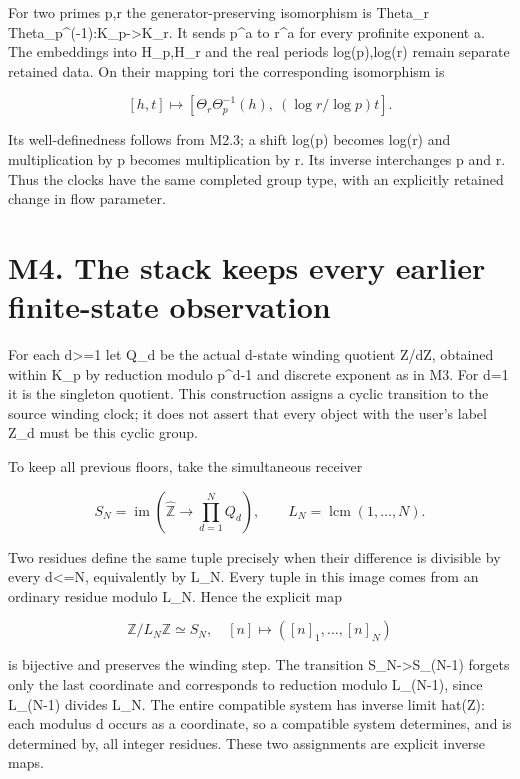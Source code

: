 For two primes p,r the generator-preserving isomorphism is Theta\_r
Theta\_p\^{}(-1):K\_p-\textgreater K\_r. It sends p\^{}a to r\^{}a for
every profinite exponent a. The embeddings into H\_p,H\_r and the real
periods log(p),log(r) remain separate retained data. On their mapping
tori the corresponding isomorphism is

\[
[h,t]\longmapsto
[\Theta_r\Theta_p^{-1}(h),\ (\log r/\log p)t].
\tag{M3.4}
\]

Its well-definedness follows from M2.3; a shift log(p) becomes log(r)
and multiplication by p becomes multiplication by r. Its inverse
interchanges p and r. Thus the clocks have the same completed group
type, with an explicitly retained change in flow parameter.

\section{M4. The stack keeps every earlier finite-state
observation}\label{m4.-the-stack-keeps-every-earlier-finite-state-observation}

For each d\textgreater=1 let Q\_d be the actual d-state winding quotient
Z/dZ, obtained within K\_p by reduction modulo p\^{}d-1 and discrete
exponent as in M3. For d=1 it is the singleton quotient. This
construction assigns a cyclic transition to the source winding clock; it
does not assert that every object with the user's label Z\_d must be
this cyclic group.

To keep all previous floors, take the simultaneous receiver

\[
S_N=\operatorname{im}\left(\widehat{\mathbb Z}
\longrightarrow\prod_{d=1}^N Q_d\right),\qquad
L_N=\operatorname{lcm}(1,\ldots,N).
\tag{M4.1}
\]

Two residues define the same tuple precisely when their difference is
divisible by every d\textless=N, equivalently by L\_N. Every tuple in
this image comes from an ordinary residue modulo L\_N. Hence the
explicit map

\[
\mathbb Z/L_N\mathbb Z\simeq S_N,\quad
[n]\longmapsto([n]_1,\ldots,[n]_N)
\tag{M4.2}
\]

is bijective and preserves the winding step. The transition
S\_N-\textgreater S\_(N-1) forgets only the last coordinate and
corresponds to reduction modulo L\_(N-1), since L\_(N-1) divides L\_N.
The entire compatible system has inverse limit hat(Z): each modulus d
occurs as a coordinate, so a compatible system determines, and is
determined by, all integer residues. These two assignments are explicit
inverse maps.

